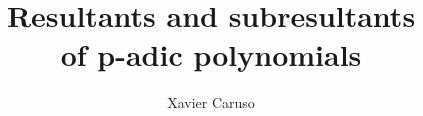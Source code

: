 \documentclass{sig-alternate}
\DeclareMathOperator{\val}{val}
\begin{document}
\newtheorem{theo}{Theorem}[section]
\newtheorem{lem}[theo]{Lemma}
\newtheorem{prop}[theo]{Proposition}
\newtheorem{cor}[theo]{Corollary}
\newtheorem{quest}[theo]{Question}
\newtheorem{rem}[theo]{Remark}
\newtheorem{ex}[theo]{Example}
\newtheorem{deftn}[theo]{Definition}
\newtheorem{rmk}[theo]{Remark}

\newcommand{\N}{\mathbb N}
\newcommand{\Z}{\mathbb Z}
\newcommand{\Zp}{\Z_p}
\newcommand{\Q}{\mathbb Q}
\newcommand{\Qp}{\Q_p}
\newcommand{\F}{\mathbb F}
\newcommand{\Fp}{\F_p}
\newcommand{\R}{\mathbb R}
\renewcommand{\O}{\mathcal O}
\newcommand{\m}{\mathfrak m}

\newcommand{\M}{\text{\tt M}}

\newcommand{\ring}{\mathfrak A}
\newcommand{\fracring}{\mathfrak K}
\renewcommand{\prec}{\text{\rm prec}}
\renewcommand{\val}{\text{\rm val}}
\newcommand{\id}{\text{\rm id}}
\newcommand{\Res}{\text{\rm Res}}
\newcommand{\lc}{\text{\rm lc}}

\renewcommand{\P}{\mathbb P}
\newcommand{\E}{\mathbb E}
\newcommand{\Var}{\text{\rm Var}}
\newcommand{\Cov}{\text{\rm Cov}}


\newcommand{\lb}{\ensuremath{\llbracket}}
\newcommand{\rb}{\ensuremath{\rrbracket}}
\newcommand{\lp}{(\!(}
\newcommand{\rp}{)\!)}
\newcommand{\col}{\: : \:}

\newcommand{\A}{W}

\def\todo#1{\ \!\!{\color{red} #1}}
\def\todofor#1#2{\ \!\!{\color{purple} {\bf #1}: #2}}

\def\binom#1#2{\Big(\begin{array}{cc} #1 \\ #2 \end{array}\Big)}

\title{Resultants and subresultants\\of p-adic polynomials}

\author{
\alignauthor Xavier Caruso\\
  \\
}

\maketitle

\begin{abstract}
\end{abstract}
\end{document}
